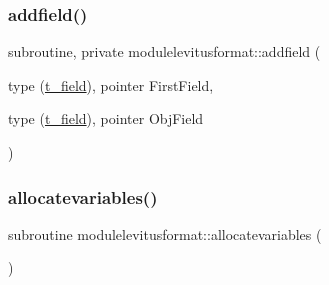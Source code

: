 \subsubsection{\texorpdfstring{addfield()}{addfield()}}
{\footnotesize\ttfamily subroutine, private modulelevitusformat\+::addfield (\begin{DoxyParamCaption}\item[{type (\mbox{\hyperlink{structmodulelevitusformat_1_1t__field}{t\+\_\+field}}), pointer}]{First\+Field,  }\item[{type (\mbox{\hyperlink{structmodulelevitusformat_1_1t__field}{t\+\_\+field}}), pointer}]{Obj\+Field }\end{DoxyParamCaption})\hspace{0.3cm}{\ttfamily [private]}}

\mbox{\label{namespacemodulelevitusformat_a1666412a426a4d69b36a48bbb07feb9e}} 
\subsubsection{\texorpdfstring{allocatevariables()}{allocatevariables()}}
{\footnotesize\ttfamily subroutine modulelevitusformat\+::allocatevariables (\begin{DoxyParamCaption}{ }\end{DoxyParamCaption})\hspace{0.3cm}{\ttfamily [private]}}

